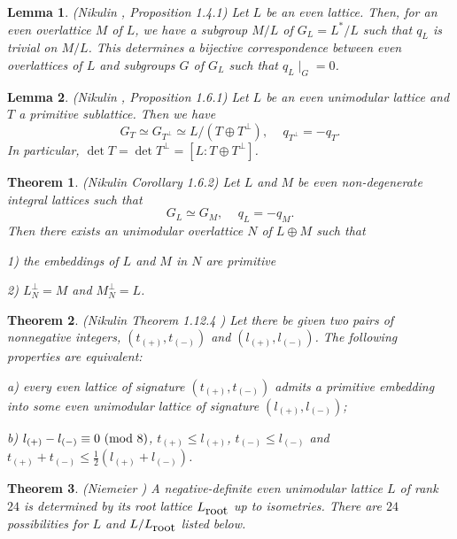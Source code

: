 \documentclass{amsart}
\newtheorem{theo}{Theorem}
\newtheorem{lem}{Lemma}
\begin{document}
\begin{lem}(Nikulin \cite{Nik}, Proposition 1.4.1)
Let $L$ be an even lattice. Then, for an even overlattice $M$ of $L$, we have a subgroup $M/L$ of $G_L=L^*/L$ such that $q_L$ is trivial on $M/L$. This determines a bijective correspondence between even overlattices of $L$ and subgroups $G$ of $G_L$ such that $q_L\mid_G=0$.
\end{lem}

\begin{lem}(Nikulin \cite{Nik}, Proposition 1.6.1)
Let $L$ be an even unimodular lattice and $T$ a primitive sublattice. Then we have
$$G_T\simeq G_{T^{\perp}} \simeq L/(T\oplus T^{\perp}),\,\,\,\,\,\,\,q_{T^{\perp}}=-q_T.$$
In particular, $ \det T =\det  T^{\perp} =[L:T\oplus T^{\perp}]$.
\end{lem}




\begin{theo} (Nikulin \cite{Nik} Corollary 1.6.2)
Let $L$ and $M$ be even non-degenerate integral lattices such that
$$G_L \simeq G_M,\,\,\,\,\,\,\,q_L=-q_M.$$
Then there exists an unimodular overlattice $N$ of $L\oplus M$ such that

1) the embeddings of $L$ and $M$ in $N$ are primitive

2) $L_N^{\perp}=M$ and $M_N^{\perp}=L$.
\end{theo}

\begin{theo}(Nikulin \cite{Nik} Theorem 1.12.4 )
Let there be given two pairs of nonnegative integers, $(t_{(+)},t_{(-)})$ and  $(l_{(+)},l_{(-)})$. The following properties are equivalent:

a) every even lattice of signature  $(t_{(+)},t_{(-)})$ admits a primitive embedding into some even unimodular lattice of signature  $(l_{(+)},l_{(-)})$;

b)  $l_{(+)}-l_{(-)} \equiv 0 \,\, (\hbox{mod}\,\, 8)$, $t_{(+)} \leq l_{(+)}$, $t_{(-)} \leq l_{(-)}$ and  $t_{(+)}+t_{(-)} \leq \frac {1}{2}(l_{(+)}+l_{(-)})$.

\end{theo}
    


\begin{theo}(Niemeier \cite{Nie})
A negative-definite even unimodular lattice $L$ of rank $24$ is determined by its root lattice $L_{\hbox{root}}$ up to isometries. There are $24$ possibilities for $L$ and $L/L_{\hbox{root}}$ listed below.
\end{theo}
\end{document}
